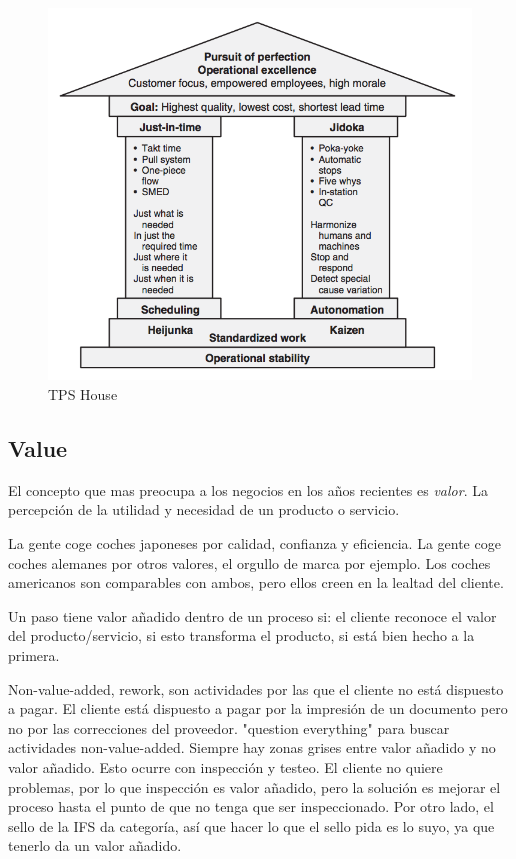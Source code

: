 \documentclass[]{article}
\begin{document}
\begin{figure}[ht!]
	\centering
	\includegraphics[width=120mm]{imagenes/TPSHouse.png}
	\caption{TPS House}
	\label{fig:TPS House}
\end{figure}

\subsection{Value}

El concepto que mas preocupa a los negocios en los años recientes es \textit{valor}. La percepción de la utilidad y necesidad de un producto o servicio. 

La gente coge coches japoneses por calidad, confianza y eficiencia. La gente coge coches alemanes por otros valores, el orgullo de marca por ejemplo. Los coches americanos son comparables con ambos, pero ellos creen en la lealtad del cliente. 

Un paso tiene valor añadido dentro de un proceso si: el cliente reconoce el valor del producto/servicio, si esto transforma el producto, si está bien hecho a la primera.

Non-value-added, rework, son actividades por las que el cliente no está dispuesto a pagar. El cliente está dispuesto a pagar por la impresión de un documento pero no por las correcciones del proveedor. "question everything" para buscar actividades non-value-added. Siempre hay zonas grises entre valor añadido y no valor añadido. Esto ocurre con inspección y testeo. El cliente no quiere problemas, por lo que inspección es valor añadido, pero la solución es mejorar el proceso hasta el punto de que no tenga que ser inspeccionado. Por otro lado, el sello de la IFS da categoría, así que hacer lo que el sello pida es lo suyo, ya que tenerlo da un valor añadido.
\end{document}
